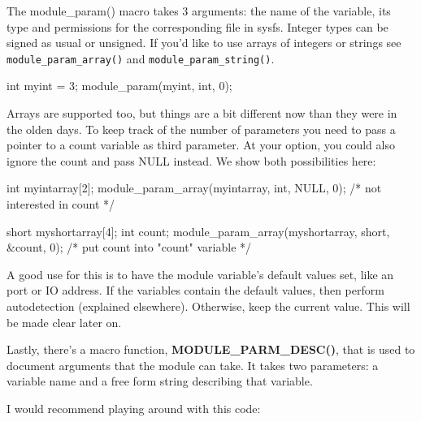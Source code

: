 \documentclass[10pt, oneside]{book}
\begin{document}
The module\_param() macro takes 3 arguments: the name of the variable, its type and permissions for the corresponding file in sysfs.
Integer types can be signed as usual or unsigned. If you'd like to use arrays of integers or strings see \verb|module_param_array()| and \verb|module_param_string()|.

\begin{code}
int myint = 3;
module_param(myint, int, 0);
\end{code}

Arrays are supported too, but things are a bit different now than they were in the olden days.
To keep track of the number of parameters you need to pass a pointer to a count variable as third parameter. 
At your option, you could also ignore the count and pass NULL instead. We show both possibilities here:

\begin{code}
int myintarray[2];
module_param_array(myintarray, int, NULL, 0); /* not interested in count */

short myshortarray[4];
int count;
module_param_array(myshortarray, short, &count, 0); /* put count into "count" variable */
\end{code}

A good use for this is to have the module variable's default values set, like an port or IO address.
If the variables contain the default values, then perform autodetection (explained elsewhere). Otherwise, keep the current value.
This will be made clear later on.

Lastly, there's a macro function, \textbf{MODULE\_PARM\_DESC()}, that is used to document arguments that the module can take.
It takes two parameters: a variable name and a free form string describing that variable.


I would recommend playing around with this code:
\end{document}
